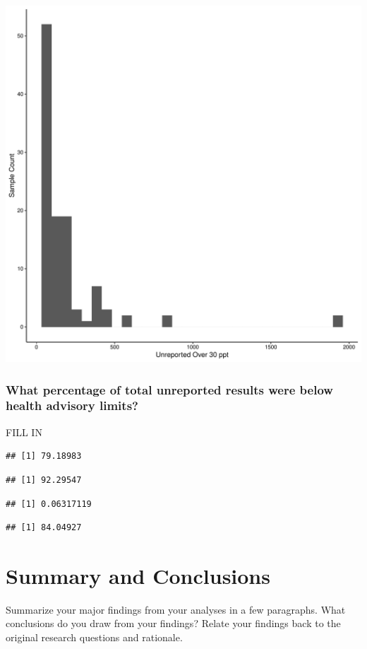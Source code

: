 \documentclass[
  12pt,
]{article}
\begin{document}
\includegraphics{PFAS_FinalProject_files/figure-latex/unnamed-chunk-27-1.pdf}

\hypertarget{what-percentage-of-total-unreported-results-were-below-health-advisory-limits}{%
\subsubsection{What percentage of total unreported results were below
health advisory
limits?}\label{what-percentage-of-total-unreported-results-were-below-health-advisory-limits}}

FILL IN

\begin{verbatim}
## [1] 79.18983
\end{verbatim}

\begin{verbatim}
## [1] 92.29547
\end{verbatim}

\begin{verbatim}
## [1] 0.06317119
\end{verbatim}

\begin{verbatim}
## [1] 84.04927
\end{verbatim}

\newpage

\hypertarget{summary-and-conclusions}{%
\section{Summary and Conclusions}\label{summary-and-conclusions}}

Summarize your major findings from your analyses in a few paragraphs.
What conclusions do you draw from your findings? Relate your findings
back to the original research questions and rationale.
\end{document}

